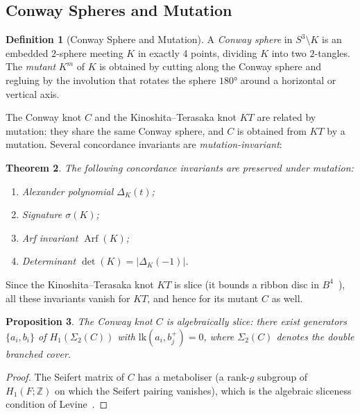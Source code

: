\documentclass[12pt,a4paper]{amsart}
\newtheorem{theorem}{Theorem}[section]
\newtheorem{proposition}[theorem]{Proposition}
\theoremstyle{definition}
\newtheorem{definition}[theorem]{Definition}
\theoremstyle{remark}
\DeclareMathOperator{\Arf}{Arf}
\newcommand{\Z}{\mathbb{Z}}
\begin{document}
\subsection{Conway Spheres and Mutation}

\begin{definition}[Conway Sphere and Mutation]
A \emph{Conway sphere} in $S^3 \setminus K$ is an embedded $2$-sphere
meeting $K$ in exactly 4 points, dividing $K$ into two $2$-tangles.
The \emph{mutant} $K^m$ of $K$ is obtained by cutting along the Conway
sphere and regluing by the involution that rotates the sphere $180°$
around a horizontal or vertical axis.
\end{definition}

The Conway knot $C$ and the Kinoshita--Terasaka knot $KT$ are related by
mutation: they share the same Conway sphere, and $C$ is obtained from $KT$
by a mutation. Several concordance invariants are \emph{mutation-invariant}:

\begin{theorem}
The following concordance invariants are preserved under mutation:
\begin{enumerate}[label=\roman*)]
\item Alexander polynomial $\Delta_K(t)$;
\item Signature $\sigma(K)$;
\item Arf invariant $\Arf(K)$;
\item Determinant $\det(K) = |\Delta_K(-1)|$.
\end{enumerate}
\end{theorem}

Since the Kinoshita--Terasaka knot $KT$ is slice (it bounds a ribbon disc
in $B^4$~\cite{KinoshitaTerasaka1957}), all these invariants vanish for $KT$,
and hence for its mutant $C$ as well.

\begin{proposition}
The Conway knot $C$ is algebraically slice: there exist generators
$\{a_i, b_i\}$ of $H_1(\Sigma_2(C))$ with $\mathrm{lk}(a_i, b_j^+) = 0$,
where $\Sigma_2(C)$ denotes the double branched cover.
\end{proposition}

\begin{proof}
The Seifert matrix of $C$ has a metaboliser (a rank-$g$ subgroup of
$H_1(F; \Z)$ on which the Seifert pairing vanishes), which is the algebraic
sliceness condition of Levine~\cite{Levine1969}.
\end{proof}

\end{document}
